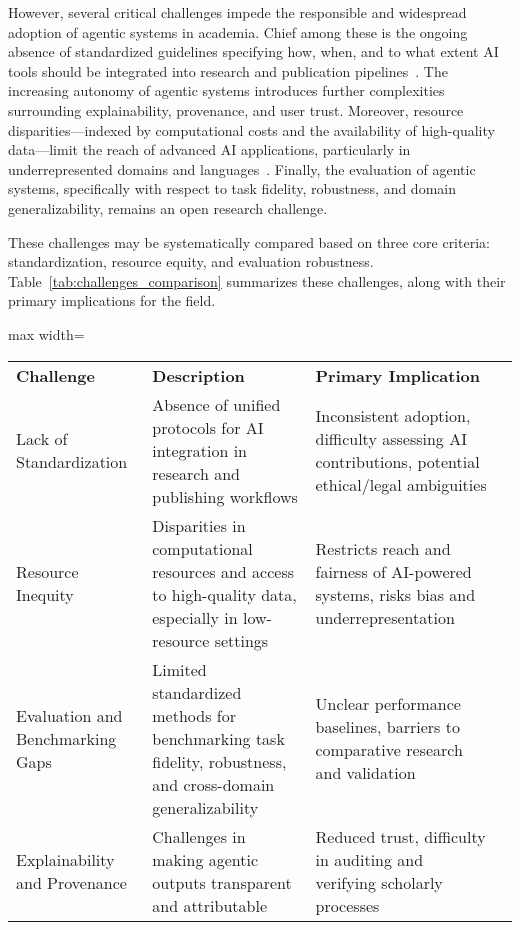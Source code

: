 However, several critical challenges impede the responsible and widespread adoption of agentic systems in academia. Chief among these is the ongoing absence of standardized guidelines specifying how, when, and to what extent AI tools should be integrated into research and publication pipelines~\cite{ref101,ref106}. The increasing autonomy of agentic systems introduces further complexities surrounding explainability, provenance, and user trust. Moreover, resource disparities—indexed by computational costs and the availability of high-quality data—limit the reach of advanced AI applications, particularly in underrepresented domains and languages~\cite{ref103,ref104,ref106}. Finally, the evaluation of agentic systems, specifically with respect to task fidelity, robustness, and domain generalizability, remains an open research challenge.

These challenges may be systematically compared based on three core criteria: standardization, resource equity, and evaluation robustness. Table~\ref{tab:challenges_comparison} summarizes these challenges, along with their primary implications for the field.

\begin{table*}[htbp]
\centering
\caption{Principal challenges in integrating agentic systems into academic workflows, mapped to their primary implications.}
\label{tab:challenges_comparison}
\begin{adjustbox}{max width=\textwidth}
\begin{tabular}{@{}llll@{}}
\toprule
\textbf{Challenge} & \textbf{Description} & \textbf{Primary Implication} &  \\
Lack of Standardization & Absence of unified protocols for AI integration in research and publishing workflows & Inconsistent adoption, difficulty assessing AI contributions, potential ethical/legal ambiguities &  \\
Resource Inequity & Disparities in computational resources and access to high-quality data, especially in low-resource settings & Restricts reach and fairness of AI-powered systems, risks bias and underrepresentation &  \\
Evaluation and Benchmarking Gaps & Limited standardized methods for benchmarking task fidelity, robustness, and cross-domain generalizability & Unclear performance baselines, barriers to comparative research and validation  &  \\
Explainability and Provenance & Challenges in making agentic outputs transparent and attributable & Reduced trust, difficulty in auditing and verifying scholarly processes &  \\
\bottomrule
\end{tabular}
\end{adjustbox}
\end{table*}

